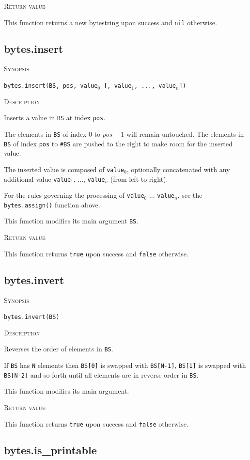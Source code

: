 \documentclass[11pt]{report}
\newcommand{\mansection}[1]{\vspace{0.5em}\par\noindent\textsc{#1}\vspace{0.5em}\par}
\newcommand{\syn}[1]{\texttt{#1}}
\begin{document}
\mansection{Return value}
  This function returns a new bytestring upon success and \syn{nil} otherwise.

\subsection{bytes.insert}

\mansection{Synopsis}
\syn{bytes.insert(BS, pos, \syn{value$_0$} [, \syn{value$_1$}, ..., \syn{value$_n$}])}

\mansection{Description}
  Inserts a value in \syn{BS} at index \syn{pos}.

  The elements in \syn{BS} of index 0 to $pos-1$ will remain untouched.
  The elements in \syn{BS} of index \syn{pos} to \syn{\#BS} are pushed to the right
  to make room for the inserted value.

  The inserted value is composed of \syn{value$_0$}, optionally concatenated with
  any additional value \syn{value$_1$}, ..., \syn{value$_n$} (from left to right).

  For the rules governing the processing of \syn{value$_0$} ... \syn{value$_n$}, see
  the \syn{bytes.assign()} function above.

  This function modifies its main argument \syn{BS}.
  
\mansection{Return value}
  This function returns \syn{true} upon success and \syn{false} otherwise.

\subsection{bytes.invert}

\mansection{Synopsis}
\syn{bytes.invert(BS)}

\mansection{Description}
  Reverses the order of elements in \syn{BS}.

  If \syn{BS} has \syn{N} elements then \syn{BS[0]} is swapped with \syn{BS[N-1]},
  \syn{BS[1]} is swapped with \syn{BS[N-2]} and so forth until all elements are
  in reverse order in \syn{BS}.

  This function modifies its main argument.
\mansection{Return value}
  This function returns \syn{true} upon success and \syn{false} otherwise.


\subsection{bytes.is\_printable}
\end{document}
